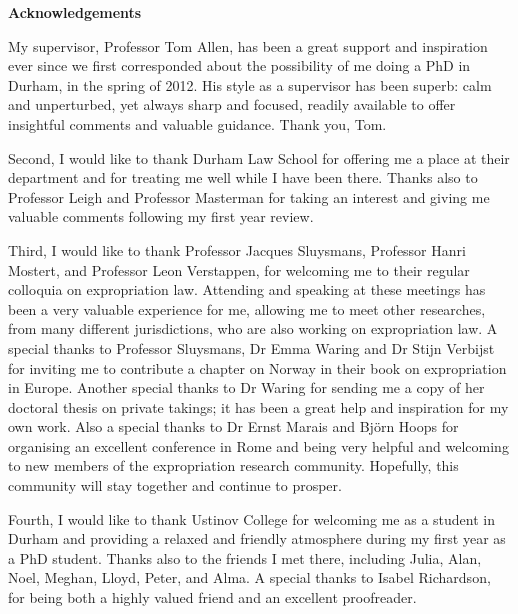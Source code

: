 


\begin{quoting}
  \singlespace
    \begin{center}
  {\LARGE \bfseries  Acknowledgements}\\
  \vspace*{0.5cm}
  \end{center}
\noindent

My supervisor, Professor Tom Allen, has been a great support and inspiration ever since we first corresponded about the possibility of me doing a PhD in Durham, in the spring of 2012. His style as a supervisor has been superb: calm and unperturbed, yet always sharp and focused, readily available to offer insightful comments and valuable guidance. Thank you, Tom.

Second, I would like to thank Durham Law School for offering me a place at their department and for treating me well while I have been there. Thanks also to Professor Leigh and Professor Masterman for taking an interest and giving me valuable comments following my first year review.

Third, I would like to thank Professor Jacques Sluysmans, Professor Hanri Mostert, and Professor Leon Verstappen, for welcoming me to their regular colloquia on expropriation law. Attending and speaking at these meetings has been a very valuable experience for me, allowing me to meet other researches, from many different jurisdictions, who are also working on expropriation law. A special thanks to Professor Sluysmans, Dr Emma Waring and Dr Stijn Verbijst for inviting me to contribute a chapter on Norway in their book on expropriation in Europe. Another special thanks to Dr Waring for sending me a copy of her doctoral thesis on private takings; it has been a great help and inspiration for my own work. Also a special thanks to Dr Ernst Marais and Bj\"{o}rn Hoops for organising an excellent conference in Rome and being very helpful and welcoming to new members of the expropriation research community. Hopefully, this community will stay together and continue to prosper.

Fourth, I would like to thank Ustinov College for welcoming me as a student in Durham and providing a relaxed and friendly atmosphere during my first year as a PhD student. Thanks also to the friends I met there, including Julia, Alan, Noel, Meghan, Lloyd, Peter, and Alma. A special thanks to Isabel Richardson, for being both a highly valued friend and an excellent proofreader.


\end{quoting}
